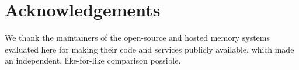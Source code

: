 \documentclass[11pt]{article}
\begin{document}




\section*{Acknowledgements}
We thank the maintainers of the open-source and hosted memory systems evaluated
here for making their code and services publicly available, which made an
independent, like-for-like comparison possible.




\appendix


\end{document}

